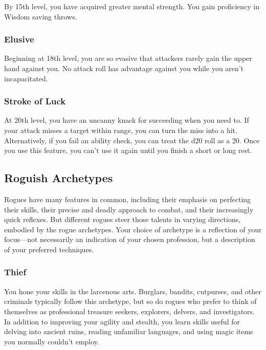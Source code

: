 \documentclass[
]{article}
\begin{document}
By 15th level, you have acquired greater mental strength. You gain
proficiency in Wisdom saving throws.

\hypertarget{elusive}{%
\subsubsection{Elusive}\label{elusive}}

Beginning at 18th level, you are so evasive that attackers rarely gain
the upper hand against you. No attack roll has advantage against you
while you aren't incapacitated.

\hypertarget{stroke-of-luck}{%
\subsubsection{Stroke of Luck}\label{stroke-of-luck}}

At 20th level, you have an uncanny knack for succeeding when you need
to. If your attack misses a target within range, you can turn the miss
into a hit. Alternatively, if you fail an ability check, you can treat
the d20 roll as a 20. Once you use this feature, you can't use it again
until you finish a short or long rest.

\hypertarget{roguish-archetypes}{%
\subsection{Roguish Archetypes}\label{roguish-archetypes}}

Rogues have many features in common, including their emphasis on
perfecting their skills, their precise and deadly approach to combat,
and their increasingly quick reflexes. But different rogues steer those
talents in varying directions, embodied by the rogue archetypes. Your
choice of archetype is a reflection of your focus---not necessarily an
indication of your chosen profession, but a description of your
preferred techniques.

\hypertarget{thief}{%
\subsubsection{Thief}\label{thief}}

You hone your skills in the larcenous arts. Burglars, bandits,
cutpurses, and other criminals typically follow this archetype, but so
do rogues who prefer to think of themselves as professional treasure
seekers, explorers, delvers, and investigators. In addition to improving
your agility and stealth, you learn skills useful for delving into
ancient ruins, reading unfamiliar languages, and using magic items you
normally couldn't employ.
\end{document}

